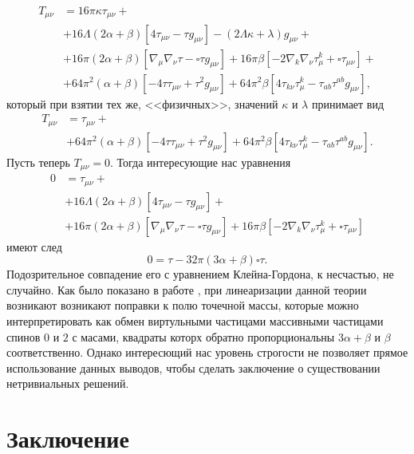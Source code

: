 \documentclass[a4paper, 14pt]{scrarticle}
\theoremstyle{Imperial}
\begin{document}
	$$\begin{aligned}
		T_{\mu\nu} &= 16\pi\kappa\tau_{\mu\nu}+\\
		&+16\Lambda\left(2\alpha+\beta\right)\left[4\tau_{\mu\nu}-\tau g_{\mu\nu}\right]-\left(2\Lambda\kappa+\lambda\right)g_{\mu\nu}+\\
		&+16\pi\left(2\alpha+\beta\right)\left[\nabla_{\mu}\nabla_{\nu}\tau-\square\tau g_{\mu\nu}\right]+16\pi\beta\left[-2\nabla_{k}\nabla_{\nu}\tau_{\mu}^{k}+\square\tau_{\mu\nu}\right]+\\
		&+64\pi^{2}\left(\alpha+\beta\right)\left[-4\tau\tau_{\mu\nu}+\tau^{2}g_{\mu\nu}\right]+64\pi^{2}\beta\left[4\tau_{k\nu}\tau_{\mu}^{k}-\tau_{ab}\tau^{ab}g_{\mu\nu}\right],
	\end{aligned}$$
	который при взятии тех же, <<физичных>>, значений $\kappa$ и $\lambda$ принимает вид
	$$\begin{aligned}
		T_{\mu\nu} &= \tau_{\mu\nu}+\\
		&+64\pi^{2}\left(\alpha+\beta\right)\left[-4\tau\tau_{\mu\nu}+\tau^{2}g_{\mu\nu}\right]+64\pi^{2}\beta\left[4\tau_{k\nu}\tau_{\mu}^{k}-\tau_{ab}\tau^{ab}g_{\mu\nu}\right].
	\end{aligned}$$
	Пусть теперь $T_{\mu\nu} = 0$. Тогда интересующие нас уравнения
	$$\begin{aligned}
		0 &= \tau_{\mu\nu}+\\
		&+16\Lambda\left(2\alpha+\beta\right)\left[4\tau_{\mu\nu}-\tau g_{\mu\nu}\right]+\\
		&+16\pi\left(2\alpha+\beta\right)\left[\nabla_{\mu}\nabla_{\nu}\tau-\square\tau g_{\mu\nu}\right]+16\pi\beta\left[-2\nabla_{k}\nabla_{\nu}\tau_{\mu}^{k}+\square\tau_{\mu\nu}\right]
	\end{aligned}$$
	имеют след
	$$0 = \tau - 32\pi\left(3\alpha+\beta\right)\square\tau.$$
	Подозрительное совпадение его с уравнением Клейна-Гордона, к несчастью, не случайно. Как было показано в работе \cite{Stelle}, при  линеаризации данной теории возникают возникают поправки к полю точечной массы, которые можно интерпретировать как обмен виртульными частицами массивными частицами спинов $0$ и $2$ с масами, квадраты которх обратно пропорциональны $3\alpha+\beta$ и $\beta$ соответственно. Однако интересющий нас уровень строгости не позволяет прямое использование данных выводов, чтобы сделать заключение о существовании нетривиальных решений.
	
	
	\section{Заключение}
	
	
	\printbibliography[title={Список литературы}]
	
	
\end{document}
